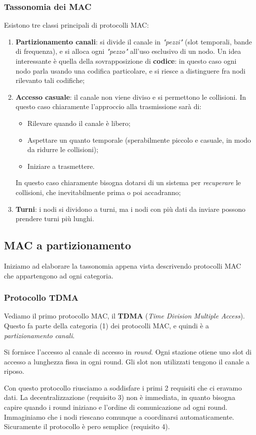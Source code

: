 \documentclass[a4paper,11pt]{article}
\begin{document}
\subsubsection{Tassonomia dei MAC}
Esistono tre classi principali di protocolli MAC:
\begin{enumerate}
	\item \textbf{Partizionamento canali}: si divide il canale in \textit{"pezzi"} (slot temporali, bande di frequenza), e si alloca ogni \textit{"pezzo"} all'uso esclusivo di un nodo.
		Un idea interessante è quella della sovrapposizione di \textbf{codice}: in questo caso ogni nodo parla usando una codifica particolare, e si riesce a distinguere fra nodi rilevanto tali codifiche;
	\item \textbf{Accesso casuale}: il canale non viene diviso e si permettono le collisioni. In questo caso chiaramente l'approccio alla trasmissione sarà di:
		\begin{itemize}
			\item Rilevare quando il canale è libero;
			\item Aspettare un quanto temporale (sperabilmente piccolo e casuale, in modo da ridurre le collisioni);
			\item Iniziare a trasmettere.
		\end{itemize}

		In questo caso chiaramente bisogna dotarsi di un sistema per \textit{recuperare} le collisioni, che inevitabilmente prima o poi accadranno;
	\item \textbf{Turni}: i nodi si dividono a turni, ma i nodi con più dati da inviare possono prendere turni più lunghi.
\end{enumerate}

\subsection{MAC a partizionamento}
Iniziamo ad elaborare la tassonomia appena vista descrivendo protocolli MAC che appartengono ad ogni categoria.

\subsubsection{Protocollo TDMA}
Vediamo il primo protocollo MAC, il \textbf{TDMA} (\textit{Time Division Multiple Access}). Questo fa parte della categoria (1) dei protocolli MAC, e quindi è a \textit{partizionamento canali}. 

Si fornisce l'accesso al canale di accesso in \textit{round}.
Ogni stazione otiene uno slot di accesso a lunghezza fissa in ogni round.
Gli slot non utilizzati tengono il canale a riposo.

Con questo protocollo riusciamo a soddisfare i primi 2 requisiti che ci eravamo dati. La decentralizzazione (requisito 3) non è immediata, in quanto bisogna capire quando i round iniziano e l'ordine di comunicazione ad ogni round.
Immaginiamo che i nodi riescano comunque a coordinarsi automaticamente.
Sicuramente il protocollo è pero semplice (requisito 4).
\end{document}
